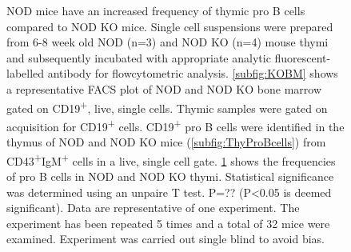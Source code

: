 \begin{figure}
\begin{subfigure}{\textwidth}
	\label{subfig:MatureBincproBgraph}
	\end{subfigure}
\caption[NOD mice have an increased frequency of thymic pro B cells compared to NOD KO mice]{NOD mice have an increased frequency of thymic pro B cells compared to NOD KO mice.
Single cell suspensions were prepared from 6-8 week old NOD (n=3) and NOD KO (n=4) mouse thymi and subsequently incubated with appropriate analytic fluorescent-labelled antibody for flowcytometric analysis.
\ref{subfig:KOBM} shows a representative FACS plot of NOD and NOD KO bone marrow gated on CD19\textsuperscript{+}, live, single cells.
Thymic samples were gated on acquisition for CD19\textsuperscript{+} cells.
CD19\textsuperscript{+} pro B cells were identified in the thymus of NOD and NOD KO mice (\ref{subfig:ThyProBcells}) from CD43\textsuperscript{+}IgM\textsuperscript{+} cells in a live, single cell gate.
\ref{subfig:MatureBincproBgraph} shows the frequencies of pro B cells in NOD and NOD KO thymi.
Statistical significance was determined using an unpaire T test. P=?? (P<0.05 is deemed significant).
Data are representative of one experiment. The experiment has been repeated 5 times and a total of 32 mice were examined.
Experiment was carried out single blind to avoid bias.}
\label{fig:MatureBincProB}
\end{figure}




